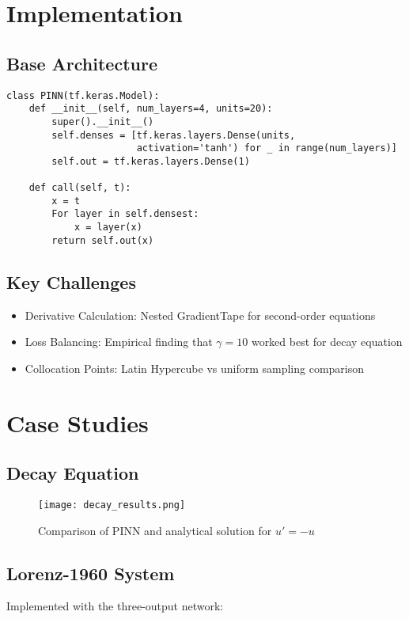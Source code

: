 \documentclass{article}
\begin{document}
\section{Implementation}

\subsection{Base Architecture}
\begin{verbatim}
class PINN(tf.keras.Model):
    def __init__(self, num_layers=4, units=20):
        super().__init__()
        self.denses = [tf.keras.layers.Dense(units, 
                       activation='tanh') for _ in range(num_layers)]
        self.out = tf.keras.layers.Dense(1)
        
    def call(self, t):
        x = t
        For layer in self.densest:
            x = layer(x)
        return self.out(x)
\end{verbatim}

\subsection{Key Challenges}
\begin{itemize}
\item Derivative Calculation: Nested GradientTape for second-order equations
\item Loss Balancing: Empirical finding that $\gamma=10$ worked best for decay equation
\item Collocation Points: Latin Hypercube vs uniform sampling comparison
\end{itemize}

\section{Case Studies}

\subsection{Decay Equation}
\begin{figure}[h]
\centering
\texttt{[image: decay\_results.png]}
\caption{Comparison of PINN and analytical solution for $u' = -u$}
\end{figure}

\subsection{Lorenz-1960 System}
Implemented with the three-output network:
\end{document}
